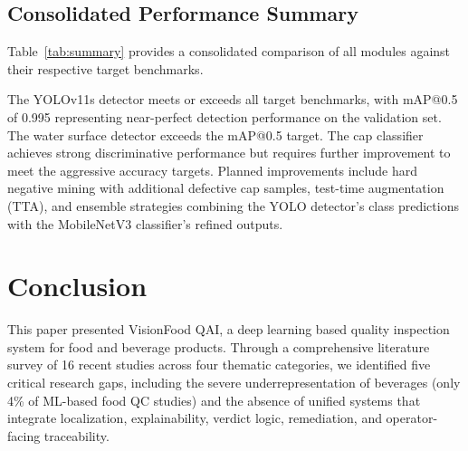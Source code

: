 \documentclass{ieeeaccess}
\begin{document}
\subsection{Consolidated Performance Summary}

Table~\ref{tab:summary} provides a consolidated comparison of all modules against their respective target benchmarks.

\begin{table}[!t]
\caption{Consolidated Performance Summary --- VisionFood QAI}
\label{tab:summary}
\centering
\small
{}
\end{table}

The YOLOv11s detector meets or exceeds all target benchmarks, with mAP@0.5 of 0.995 representing near-perfect detection performance on the validation set. The water surface detector exceeds the mAP@0.5 target. The cap classifier achieves strong discriminative performance but requires further improvement to meet the aggressive accuracy targets. Planned improvements include hard negative mining with additional defective cap samples, test-time augmentation (TTA), and ensemble strategies combining the YOLO detector's class predictions with the MobileNetV3 classifier's refined outputs.


\section{Conclusion}
\label{sec:conclusion}
This paper presented VisionFood QAI, a deep learning based quality inspection system for food and beverage products. Through a comprehensive literature survey of 16 recent studies across four thematic categories, we identified five critical research gaps, including the severe underrepresentation of beverages (only 4\% of ML-based food QC studies) and the absence of unified systems that integrate localization, explainability, verdict logic, remediation, and operator-facing traceability.
\end{document}
